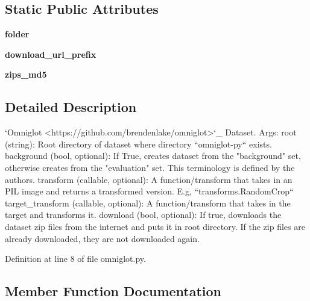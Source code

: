 \subsection*{Static Public Attributes}
\begin{DoxyCompactItemize}
\item 
\mbox{\label{classtorchvision_1_1datasets_1_1omniglot_1_1Omniglot_a8194262f873a017e1a3656a7e9bdd048}} 
{\bfseries folder}
\item 
\mbox{\label{classtorchvision_1_1datasets_1_1omniglot_1_1Omniglot_a0cecc7ea1ce26c4354a360cdc9192adb}} 
{\bfseries download\+\_\+url\+\_\+prefix}
\item 
\mbox{\label{classtorchvision_1_1datasets_1_1omniglot_1_1Omniglot_a970a8ce07d92aab527cd5866c851ae65}} 
{\bfseries zips\+\_\+md5}
\end{DoxyCompactItemize}


\subsection{Detailed Description}
\begin{DoxyVerb}`Omniglot <https://github.com/brendenlake/omniglot>`_ Dataset.
Args:
    root (string): Root directory of dataset where directory
        ``omniglot-py`` exists.
    background (bool, optional): If True, creates dataset from the "background" set, otherwise
        creates from the "evaluation" set. This terminology is defined by the authors.
    transform (callable, optional): A function/transform that  takes in an PIL image
        and returns a transformed version. E.g, ``transforms.RandomCrop``
    target_transform (callable, optional): A function/transform that takes in the
        target and transforms it.
    download (bool, optional): If true, downloads the dataset zip files from the internet and
        puts it in root directory. If the zip files are already downloaded, they are not
        downloaded again.
\end{DoxyVerb}
 

Definition at line 8 of file omniglot.\+py.



\subsection{Member Function Documentation}
\mbox{\label{classtorchvision_1_1datasets_1_1omniglot_1_1Omniglot_a43c310d2f8c2ca1f31615da228b2ec24}} 
